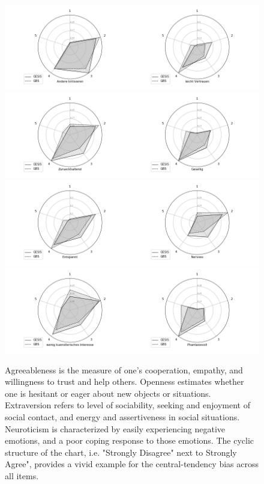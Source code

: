 \begin{figure}[ht]
	\begin{center}
\includegraphics[scale=0.42,angle=0]{fig/Agreeablenessfigure} \\
\includegraphics[scale=0.31,angle=0]{fig/Extraversionfigure} \\
\includegraphics[scale=0.31,angle=0]{fig/Neuroticismfigure} \\
\includegraphics[scale=0.31,angle=0]{fig/Opennessfigure} \\
\vspace{0.75cm}
\caption{Agreeableness is the measure of one's cooperation, empathy, and willingness to trust and help others. Openness estimates whether one is hesitant or eager about new objects or situations. Extraversion refers to level of sociability, seeking and enjoyment of social contact, and energy and assertiveness in social situations. Neuroticism is characterized by easily experiencing negative emotions, and a poor coping response to those emotions. The cyclic structure of the chart, i.e. "Strongly Disagree" next to Strongly Agree", provides a vivid example for the central-tendency bias across all items.}
\end{center}
\end{figure}

